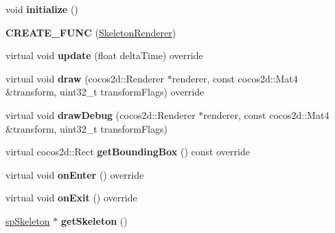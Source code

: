 \begin{DoxyCompactItemize}
\item 
\mbox{\label{classspine_1_1SkeletonRenderer_ab037a735b2761276f454ac70fdb0ff52}} 
void {\bfseries initialize} ()
\item 
\mbox{\label{classspine_1_1SkeletonRenderer_ab3f3c368717683a4967207db7c73ce16}} 
{\bfseries C\+R\+E\+A\+T\+E\+\_\+\+F\+U\+NC} (\hyperlink{classspine_1_1SkeletonRenderer}{Skeleton\+Renderer})
\item 
\mbox{\label{classspine_1_1SkeletonRenderer_acca5328cb827eae8dd8e51116d13344d}} 
virtual void {\bfseries update} (float delta\+Time) override
\item 
\mbox{\label{classspine_1_1SkeletonRenderer_a69b1f548663e94bec846d072a519de4c}} 
virtual void {\bfseries draw} (cocos2d\+::\+Renderer $\ast$renderer, const cocos2d\+::\+Mat4 \&transform, uint32\+\_\+t transform\+Flags) override
\item 
\mbox{\label{classspine_1_1SkeletonRenderer_a80e09cce49af3a3b3f431d5a4080e81d}} 
virtual void {\bfseries draw\+Debug} (cocos2d\+::\+Renderer $\ast$renderer, const cocos2d\+::\+Mat4 \&transform, uint32\+\_\+t transform\+Flags)
\item 
\mbox{\label{classspine_1_1SkeletonRenderer_ae3aff897afe61396d0f3a089475d1884}} 
virtual cocos2d\+::\+Rect {\bfseries get\+Bounding\+Box} () const override
\item 
\mbox{\label{classspine_1_1SkeletonRenderer_ad02768b95058a6ebe7f830dc5eaa8d30}} 
virtual void {\bfseries on\+Enter} () override
\item 
\mbox{\label{classspine_1_1SkeletonRenderer_a4f0191a301adde4dd9be2d1070ff766c}} 
virtual void {\bfseries on\+Exit} () override
\item 
\mbox{\label{classspine_1_1SkeletonRenderer_adcdb84551da55107a6be9e9bb99dfa9b}} 
\hyperlink{structspSkeleton}{sp\+Skeleton} $\ast$ {\bfseries get\+Skeleton} ()
\item 

\end{DoxyCompactItemize}
